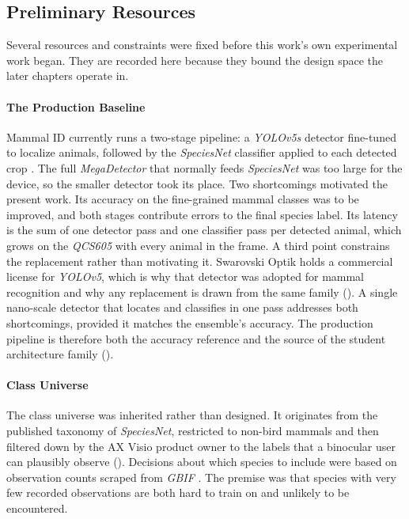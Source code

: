 \subsection{Preliminary Resources}\label{sec:pre_work}

Several resources and constraints were fixed before this work's own experimental work began. They are recorded here because they bound the design space the later chapters operate in.

\paragraph{The Production Baseline}
Mammal ID currently runs a two-stage pipeline: a \textit{YOLOv5s} detector fine-tuned to localize animals, followed by the \textit{SpeciesNet} classifier applied to each detected crop \cite{gadotCropNotCrop2024a}. The full \textit{MegaDetector} \cite{beeryEfficientPipelineCamera2019} that normally feeds \textit{SpeciesNet} was too large for the device, so the smaller detector took its place. Two shortcomings motivated the present work. Its accuracy on the fine-grained mammal classes was to be improved, and both stages contribute errors to the final species label. Its latency is the sum of one detector pass and one classifier pass per detected animal, which grows on the \textit{QCS605} with every animal in the frame. A third point constrains the replacement rather than motivating it. Swarovski Optik holds a commercial license for \textit{YOLOv5}, which is why that detector was adopted for mammal recognition and why any replacement is drawn from the same family (). A single nano-scale detector that locates and classifies in one pass addresses both shortcomings, provided it matches the ensemble's accuracy. The production pipeline is therefore both the accuracy reference and the source of the student architecture family ().

\paragraph{Class Universe}
The class universe was inherited rather than designed. It originates from the published taxonomy of \textit{SpeciesNet}, restricted to non-bird mammals and then filtered down by the AX Visio product owner to the labels that a binocular user can plausibly observe (). Decisions about which species to include were based on observation counts scraped from \textit{GBIF} \cite{GBIF}. The premise was that species with very few recorded observations are both hard to train on and unlikely to be encountered.

